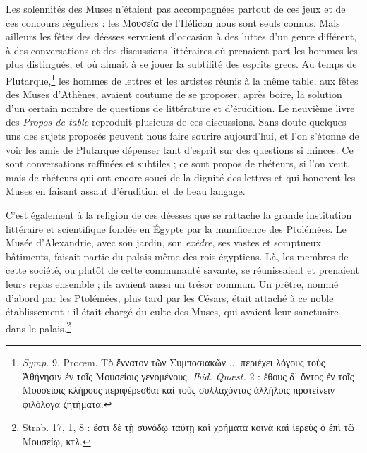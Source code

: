 \documentclass[a4paper, 11pt, oneside, polutonikogreek, french]{article}
\begin{document}
Les solennités des Muses n'étaient pas accompagnées partout de ces jeux et de ces concours réguliers : les Μουσεῖα de l'Hélicon nous sont seuls connus. Mais ailleurs les fêtes des déesses servaient d'occasion à des luttes d'un genre différent, à des conversations et des discussions littéraires où prenaient part les hommes les plus distingués, et où aimait à se jouer la subtilité des esprits grecs. Au temps de Plutarque,\footnote{\emph{Symp.} 9, Proœm. Τὸ ἔννατον τῶν Συμποσιακῶν ... περιέχει λόγους τοὺς Ἀθήνησιν ἐν τοῖς Μουσείοις γενομένους. \emph{Ibid. Quæst.} 2 : ἔθους δ᾽ ὄντος ἐν τοῖς Μουσείοις κλήρους περιφέρεσθαι καὶ τοὺς συλλαχόντας ἀλλήλοις προτείνειν φιλόλογα ζητήματα.} les hommes de lettres et les artistes réunis à la même table, aux fêtes des Muses d'Athènes, avaient coutume de se proposer, après boire, la solution d'un certain nombre de questions de littérature et d'érudition. Le neuvième livre des \emph{Propos de table} reproduit plusieurs de ces discussions. Sans doute quelques-uns des sujets proposés peuvent nous faire sourire aujourd'hui, et l'on s'étonne de voir les amis de Plutarque dépenser tant d'esprit sur des questions si minces. Ce sont conversations raffinées et subtiles ; ce sont propos de rhéteurs, si l'on veut, mais de rhéteurs qui ont encore souci de la dignité des lettres et qui honorent les Muses en faisant assaut d'érudition et de beau langage.

C'est également à la religion de ces déesses que se rattache la grande institution littéraire et scientifique fondée en Égypte par la munificence des Ptolémées. Le Musée d'Alexandrie, avec son jardin, son \emph{exèdre}, ses vastes et somptueux bâtiments, faisait partie du palais même des rois égyptiens. Là, les membres de cette société, ou plutôt de cette communauté savante, se réunissaient et prenaient leurs repas ensemble ; ils avaient aussi un trésor commun. Un prêtre, nommé d'abord par les Ptolémées, plus tard par les Césars, était attaché à ce noble établissement : il était chargé du culte des Muses, qui avaient leur sanctuaire dans le palais.\footnote{Strab. 17, 1, 8 : ἔστι δὲ τῇ συνόδῳ ταύτῃ καὶ χρήματα κοινὰ καὶ ἱερεὺς ὁ ἐπὶ τῷ Μουσείῳ, κτλ.}
\end{document}
